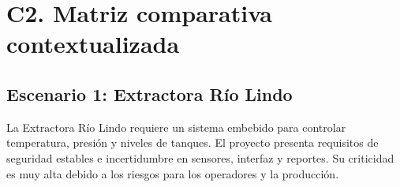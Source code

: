 

\section{C2. Matriz comparativa contextualizada}

\subsection{Escenario 1: Extractora Río Lindo}

La Extractora Río Lindo requiere un sistema embebido
para controlar temperatura, presión y niveles de
tanques. El proyecto presenta requisitos de seguridad
estables e incertidumbre en sensores, interfaz y
reportes. Su criticidad es muy alta debido a los
riesgos para los operadores y la producción.

\small
\setlength{\tabcolsep}{4pt}
\renewcommand{\arraystretch}{1.35}

